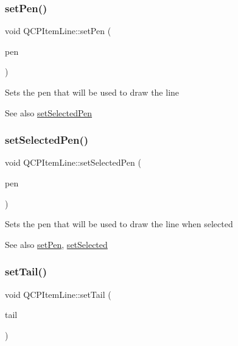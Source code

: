 \subsubsection{\texorpdfstring{set\+Pen()}{setPen()}}
{\footnotesize\ttfamily void Q\+C\+P\+Item\+Line\+::set\+Pen (\begin{DoxyParamCaption}\item[{const Q\+Pen \&}]{pen }\end{DoxyParamCaption})}

Sets the pen that will be used to draw the line

\begin{DoxySeeAlso}{See also}
\hyperlink{class_q_c_p_item_line_a3e2fec44503277e77717e9c24f87f1ea}{set\+Selected\+Pen} 
\end{DoxySeeAlso}
\hypertarget{class_q_c_p_item_line_a3e2fec44503277e77717e9c24f87f1ea}{}\label{class_q_c_p_item_line_a3e2fec44503277e77717e9c24f87f1ea} 
\subsubsection{\texorpdfstring{set\+Selected\+Pen()}{setSelectedPen()}}
{\footnotesize\ttfamily void Q\+C\+P\+Item\+Line\+::set\+Selected\+Pen (\begin{DoxyParamCaption}\item[{const Q\+Pen \&}]{pen }\end{DoxyParamCaption})}

Sets the pen that will be used to draw the line when selected

\begin{DoxySeeAlso}{See also}
\hyperlink{class_q_c_p_item_line_a572528dab61c1abe205822fbd5db4b27}{set\+Pen}, \hyperlink{class_q_c_p_abstract_item_a203de94ad586cc44d16c9565f49d3378}{set\+Selected} 
\end{DoxySeeAlso}
\hypertarget{class_q_c_p_item_line_ac264222c3297a7efe33df9345c811a5f}{}\label{class_q_c_p_item_line_ac264222c3297a7efe33df9345c811a5f} 
\subsubsection{\texorpdfstring{set\+Tail()}{setTail()}}
{\footnotesize\ttfamily void Q\+C\+P\+Item\+Line\+::set\+Tail (\begin{DoxyParamCaption}\item[{const \hyperlink{class_q_c_p_line_ending}{Q\+C\+P\+Line\+Ending} \&}]{tail }\end{DoxyParamCaption})}


